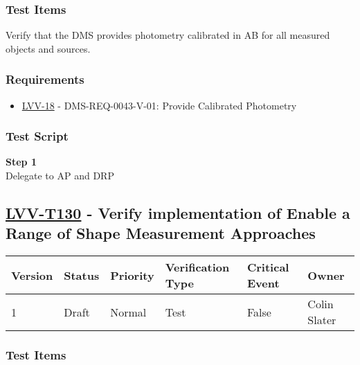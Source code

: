 \subsubsection{Test Items}\label{test-items-7}

Verify that the DMS provides photometry calibrated in AB for all
measured objects and sources.

\subsubsection{Requirements}\label{requirements-7}

\begin{itemize}
\tightlist
\item
  \href{https://jira.lsstcorp.org/browse/LVV-18}{LVV-18} -
  DMS-REQ-0043-V-01: Provide Calibrated Photometry
\end{itemize}

\subsubsection{Test Script}\label{test-script-7}

\textbf{Step 1}\\
Delegate to AP and DRP\\[2\baselineskip]

\hypertarget{lvv-t130---verify-implementation-of-enable-a-range-of-shape-measurement-approaches}{\subsection{\texorpdfstring{\href{https://jira.lsstcorp.org/secure/Tests.jspa\#/testCase/LVV-T130}{LVV-T130}
- Verify implementation of Enable a Range of Shape Measurement
Approaches}{LVV-T130 - Verify implementation of Enable a Range of Shape Measurement Approaches}}\label{lvv-t130---verify-implementation-of-enable-a-range-of-shape-measurement-approaches}}

\begin{longtable}[]{@{}llllll@{}}
\toprule
Version & Status & Priority & Verification Type & Critical Event &
Owner\tabularnewline
\midrule
\endhead
1 & Draft & Normal & Test & False & Colin Slater\tabularnewline
\bottomrule
\end{longtable}

\subsubsection{Test Items}\label{test-items-8}


